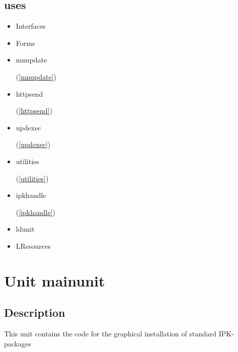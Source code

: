 \documentclass{report}
\begin{document}
\section{uses}
\begin{itemize}
\item \begin{ttfamily}Interfaces\end{ttfamily}\item \begin{ttfamily}Forms\end{ttfamily}\item \begin{ttfamily}mnupdate\end{ttfamily}(\ref{mnupdate})\item \begin{ttfamily}httpsend\end{ttfamily}(\ref{httpsend})\item \begin{ttfamily}updexec\end{ttfamily}(\ref{updexec})\item \begin{ttfamily}utilities\end{ttfamily}(\ref{utilities})\item \begin{ttfamily}ipkhandle\end{ttfamily}(\ref{ipkhandle})\item \begin{ttfamily}ldunit\end{ttfamily}\item \begin{ttfamily}LResources\end{ttfamily}\end{itemize}
\chapter{Unit mainunit}
\label{mainunit}
\section{Description}
This unit contains the code for the graphical installation of standard IPK{-}packages
\end{document}
